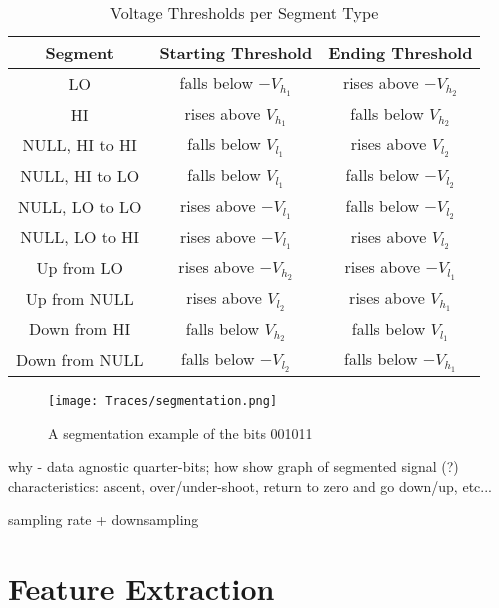 \documentclass[conference]{IEEEtran}
\begin{document}
  \begin{table}
    \caption{Voltage Thresholds per Segment Type}
    \label{tab:SegmentationLevels}
    \centering
    \begin{tabular}{|c c c|} 
      \hline
      Segment & Starting Threshold & Ending Threshold \\ [0.5ex] 
      \hline\hline
      LO & falls below $-V_{h_1}$ & rises above $-V_{h_2}$ \\
      \hline
      HI & rises above $V_{h_1}$ & falls below $V_{h_2}$ \\
      \hline
      NULL, HI to HI & falls below $V_{l_1}$ & rises above $V_{l_2}$ \\
      \hline
      NULL, HI to LO & falls below $V_{l_1}$ & falls below $-V_{l_2}$ \\
      \hline
      NULL, LO to LO & rises above $-V_{l_1}$ & falls below $-V_{l_2}$ \\
      \hline
      NULL, LO to HI & rises above $-V_{l_1}$ & rises above $V_{l_2}$ \\
      \hline
      Up from LO & rises above $-V_{h_2}$ & rises above $-V_{l_1}$ \\
      \hline
      Up from NULL & rises above $V_{l_2}$ & rises above $V_{h_1}$ \\
      \hline
      Down from HI & falls below $V_{h_2}$ & falls below $V_{l_1}$ \\
      \hline
      Down from NULL & falls below $-V_{l_2}$ & falls below $-V_{h_1}$ \\
      \hline
    \end{tabular}
  \end{table}
  
  \begin{figure}[t]
    \centering
    \texttt{[image: Traces/segmentation.png]}
    \caption{A segmentation example of the bits 001011}
    \label{fig:SegmentationTrace}
  \end{figure}
  
  \color{gray}
  why - data agnostic
  quarter-bits; how
  show graph of segmented signal (?)
  characteristics: ascent, over/under-shoot, return to zero and go down/up,
  etc...

  sampling rate + downsampling
  \color{black}
  
\section{Feature Extraction} \label{FeatureExtraction}
\end{document}
